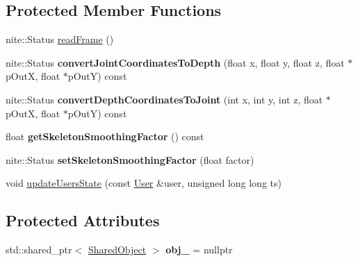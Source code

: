 \subsection*{\-Protected \-Member \-Functions}
\begin{DoxyCompactItemize}
\item 
nite\-::\-Status \hyperlink{classs9_1_1oni_1_1OpenNISkeleton_ab7d1842749a0e1b9c89cd91386c73fd0}{read\-Frame} ()
\item 
\hypertarget{classs9_1_1oni_1_1OpenNISkeleton_ab2b0cb54da4a043508423203b5669181}{nite\-::\-Status {\bfseries convert\-Joint\-Coordinates\-To\-Depth} (float x, float y, float z, float $\ast$p\-Out\-X, float $\ast$p\-Out\-Y) const }\label{classs9_1_1oni_1_1OpenNISkeleton_ab2b0cb54da4a043508423203b5669181}

\item 
\hypertarget{classs9_1_1oni_1_1OpenNISkeleton_a5375c4641f41211cb518777372101ca7}{nite\-::\-Status {\bfseries convert\-Depth\-Coordinates\-To\-Joint} (int x, int y, int z, float $\ast$p\-Out\-X, float $\ast$p\-Out\-Y) const }\label{classs9_1_1oni_1_1OpenNISkeleton_a5375c4641f41211cb518777372101ca7}

\item 
\hypertarget{classs9_1_1oni_1_1OpenNISkeleton_a5eeb8a84e335678e69c97d5a9ce9d34c}{float {\bfseries get\-Skeleton\-Smoothing\-Factor} () const }\label{classs9_1_1oni_1_1OpenNISkeleton_a5eeb8a84e335678e69c97d5a9ce9d34c}

\item 
\hypertarget{classs9_1_1oni_1_1OpenNISkeleton_a111290aca126cb6ba2562396a0a28c58}{nite\-::\-Status {\bfseries set\-Skeleton\-Smoothing\-Factor} (float factor)}\label{classs9_1_1oni_1_1OpenNISkeleton_a111290aca126cb6ba2562396a0a28c58}

\item 
void \hyperlink{classs9_1_1oni_1_1OpenNISkeleton_a741c8c2998d95615d658fc394c24f504}{update\-Users\-State} (const \hyperlink{structs9_1_1oni_1_1OpenNISkeleton_1_1User}{\-User} \&user, unsigned long long ts)
\end{DoxyCompactItemize}
\subsection*{\-Protected \-Attributes}
\begin{DoxyCompactItemize}
\item 
\hypertarget{classs9_1_1oni_1_1OpenNISkeleton_a5e24753efe4c7c86bff349a30264b39d}{std\-::shared\-\_\-ptr$<$ \hyperlink{structs9_1_1oni_1_1OpenNISkeleton_1_1SharedObject}{\-Shared\-Object} $>$ {\bfseries obj\-\_\-} = nullptr}\label{classs9_1_1oni_1_1OpenNISkeleton_a5e24753efe4c7c86bff349a30264b39d}

\end{DoxyCompactItemize}

